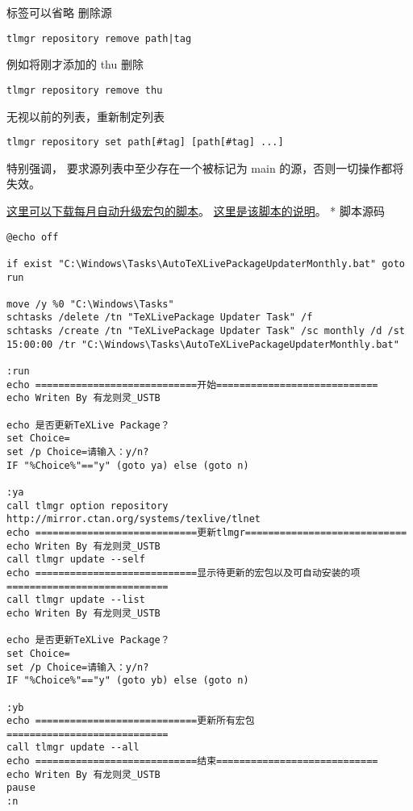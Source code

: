 标签可以省略 删除源
\begin{verbatim}
tlmgr repository remove path|tag
\end{verbatim}

例如将刚才添加的 thu 删除
\begin{verbatim}
tlmgr repository remove thu
\end{verbatim}

无视以前的列表，重新制定列表
\begin{verbatim}
tlmgr repository set path[#tag] [path[#tag] ...]
\end{verbatim}

特别强调，\TeXLive{} 要求源列表中至少存在一个被标记为 main
的源，否则一切操作都将失效。



\href{http://pd10ibe5c.bkt.clouddn.com/TeXLive\%E5\%AE\%8F\%E5\%8C\%85\%E6\%AF\%8F\%E6\%9C\%88\%E8\%87\%AA\%E5\%8A\%A8\%E6\%9B\%B4\%E6\%96\%B0.zip}{这里可以下载每月自动升级\TeXLive{}宏包的脚本}。
\href{http://htharoldht.com/texlive-package-automatically-upgrades-every-month/}{这里是该脚本的说明}。
* 脚本源码

\begin{verbatim}
@echo off

if exist "C:\Windows\Tasks\AutoTeXLivePackageUpdaterMonthly.bat" goto run

move /y %0 "C:\Windows\Tasks"
schtasks /delete /tn "TeXLivePackage Updater Task" /f
schtasks /create /tn "TeXLivePackage Updater Task" /sc monthly /d /st 15:00:00 /tr "C:\Windows\Tasks\AutoTeXLivePackageUpdaterMonthly.bat"

:run
echo ============================开始============================
echo Writen By 有龙则灵_USTB

echo 是否更新TeXLive Package？
set Choice=
set /p Choice=请输入：y/n?
IF "%Choice%"=="y" (goto ya) else (goto n)

:ya
call tlmgr option repository http://mirror.ctan.org/systems/texlive/tlnet
echo ============================更新tlmgr============================
echo Writen By 有龙则灵_USTB
call tlmgr update --self
echo ============================显示待更新的宏包以及可自动安装的项============================
call tlmgr update --list
echo Writen By 有龙则灵_USTB

echo 是否更新TeXLive Package？
set Choice=
set /p Choice=请输入：y/n?
IF "%Choice%"=="y" (goto yb) else (goto n)

:yb
echo ============================更新所有宏包============================
call tlmgr update --all
echo ============================结束============================
echo Writen By 有龙则灵_USTB
pause
:n
\end{verbatim}

